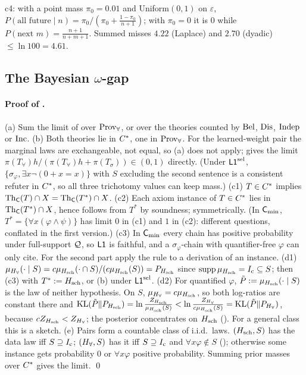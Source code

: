 c4: with a point mass $\pi_0=0.01$ and Uniform$(0,1)$ on $\varepsilon$, $P(\text{all future}\mid n)=\pi_0/(\pi_0+\frac{1-\pi_0}{n+1})$; with $\pi_0=0$ it is $0$ while $P(\text{next }m)=\frac{n+1}{n+m+1}$. Summed misses $4.22$ (Laplace) and $2.70$ (dyadic) $\le\ln100=4.61$.

\subsection{The Bayesian \texorpdfstring{$\omega$}{omega}-gap}\label{app:univ:omega}

\paragraph{Proof of .} (a) Sum the limit of  over $\mathrm{Prov}_{\forall}$, or over the theories counted by $\mathrm{Bel}$, $\mathrm{Dis}$, $\mathrm{Indep}$ or $\mathrm{Inc}$. (b) Both theories lie in $C^{*}$, one in $\mathrm{Prov}_{\forall}$. For the learned-weight pair the marginal laws are exchangeable, not equal, so (a) does not apply;  gives the limit $\pi(T_\forall)h/(\pi(T_\forall)h+\pi(T_\sigma))\in(0,1)$ directly. (Under $\mathord{\mathsf{L1}}^{\mathrm{sel}}$, $\{\sigma_\varphi,\exists x\neg(0+x=x)\}$ with $S$ excluding the second sentence is a consistent refuter in $C^{*}$, so all three trichotomy values can keep mass.) (c1) $T\in C^{*}$ implies $\mathrm{Th}_{\mathsf C}(T)\cap X=\mathrm{Th}_{\mathsf C}(T^*)\cap X$. (c2) Each axiom instance of $T\in C^{*}$ lies in $\mathrm{Th}_{\mathsf C}(T^*)\cap X$, hence follows from $T^*$ by soundness; symmetrically. (In $\mathsf{C}_{\min}$, $T^*=\{\forall x(\varphi\wedge\psi)\}$ has limit $0$ in (c1) and $1$ in (c2): different questions, conflated in the first version.) (c3) In $\mathsf{C}_{\min}$ every chain has positive probability under full-support $\mathcal{Q}$, so $\mathord{\mathsf{L1}}$ is faithful, and a $\sigma_\varphi$-chain with quantifier-free $\varphi$ can only cite. For the second part apply the rule to a derivation of an instance. (d1) $\mu_{H_{\forall}}(\cdot\mid S)=c\mu_{H_{\mathrm{sch}}}(\cdot\cap S)/(c\mu_{H_{\mathrm{sch}}}(S))=P_{H_{\mathrm{sch}}}$ since $\operatorname{supp}\mu_{H_{\mathrm{sch}}}=I_{\mathrm{c}}\subseteq S$; then (c3) with $T^*:=H_{\mathrm{sch}}$, or (b) under $\mathord{\mathsf{L1}}^{\mathrm{sel}}$. (d2) For quantified $\varphi$, $\tilde P:=\mu_{H_{\mathrm{sch}}}(\cdot\mid S)$ is the law of neither hypothesis. On $S$, $\mu_{H_{\forall}}=c\mu_{H_{\mathrm{sch}}}$, so both log-ratios are constant there and $\mathrm{KL}(\tilde P\|P_{H_{\mathrm{sch}}})=\ln\frac{Z_{H_{\mathrm{sch}}}}{\mu_{H_{\mathrm{sch}}}(S)}<\ln\frac{Z_{H_{\forall}}}{c\mu_{H_{\mathrm{sch}}}(S)}=\mathrm{KL}(\tilde P\|P_{H_{\forall}})$, because $cZ_{H_{\mathrm{sch}}}<Z_{H_{\forall}}$; the posterior concentrates on $H_{\mathrm{sch}}$ (). For a general class this is a sketch. (e) Pairs form a countable class of i.i.d.\ laws. $(H_{\mathrm{sch}},S)$ has the data law iff $S\supseteq I_{\mathrm{c}}$; $(H_{\forall},S)$ has it iff $S\supseteq I_{\mathrm{c}}$ and $\forall x\varphi\notin S$ (); otherwise some instance gets probability $0$ or $\forall x\varphi$ positive probability. Summing prior masses over $C^{*}$ gives the limit. \qed

